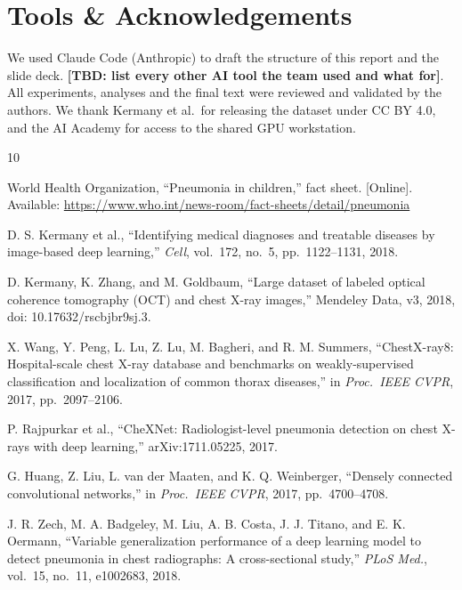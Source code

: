 \documentclass[conference]{IEEEtran}
\newcommand{\TBD}[1]{{\color{red}\textbf{[TBD: #1]}}}
\begin{document}
\section*{Tools \& Acknowledgements}
We used Claude Code (Anthropic) to draft the structure of this report and the slide deck. \TBD{list every other AI tool the team used and what for}. All experiments, analyses and the final text were reviewed and validated by the authors. We thank Kermany et al.\ for releasing the dataset under CC BY 4.0, and the AI Academy for access to the shared GPU workstation.

\begin{thebibliography}{10}\itemsep-1pt

World Health Organization, ``Pneumonia in children,'' fact sheet. [Online]. Available: \url{https://www.who.int/news-room/fact-sheets/detail/pneumonia}

D. S. Kermany et al., ``Identifying medical diagnoses and treatable diseases by image-based deep learning,'' \emph{Cell}, vol.~172, no.~5, pp.~1122--1131, 2018.

D. Kermany, K. Zhang, and M. Goldbaum, ``Large dataset of labeled optical coherence tomography (OCT) and chest X-ray images,'' Mendeley Data, v3, 2018, doi: 10.17632/rscbjbr9sj.3.

X. Wang, Y. Peng, L. Lu, Z. Lu, M. Bagheri, and R. M. Summers, ``ChestX-ray8: Hospital-scale chest X-ray database and benchmarks on weakly-supervised classification and localization of common thorax diseases,'' in \emph{Proc.\ IEEE CVPR}, 2017, pp.~2097--2106.

P. Rajpurkar et al., ``CheXNet: Radiologist-level pneumonia detection on chest X-rays with deep learning,'' arXiv:1711.05225, 2017.

G. Huang, Z. Liu, L. van der Maaten, and K. Q. Weinberger, ``Densely connected convolutional networks,'' in \emph{Proc.\ IEEE CVPR}, 2017, pp.~4700--4708.

J. R. Zech, M. A. Badgeley, M. Liu, A. B. Costa, J. J. Titano, and E. K. Oermann, ``Variable generalization performance of a deep learning model to detect pneumonia in chest radiographs: A cross-sectional study,'' \emph{PLoS Med.}, vol.~15, no.~11, e1002683, 2018.


\end{thebibliography}
\end{document}
